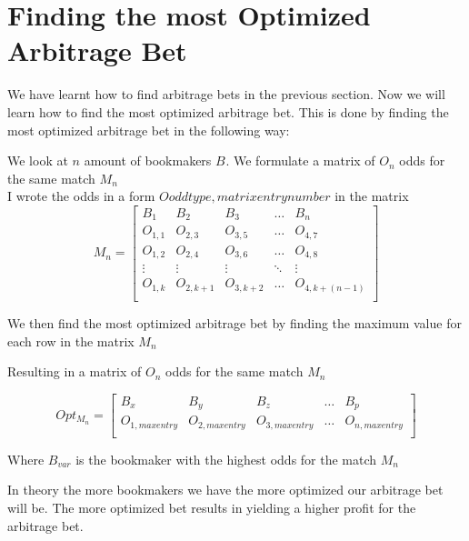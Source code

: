 
\section{Finding the most Optimized Arbitrage Bet}

We have learnt how to find arbitrage bets in the previous section. Now we will learn how to find the most optimized arbitrage bet. This is done by finding the most optimized arbitrage bet in the following way:

We look at $n$ amount of bookmakers $B_{}$. We formulate a matrix of $O_{n}$ odds for the same match $M_{n}$\\

I wrote the odds in a form $O{oddtype,matrixentrynumber}$ in the matrix\\

\begin{equation}
    M_{n} = \begin{bmatrix}
        B_{1} & B_{2} & B_{3} & \dots & B_{n} \\
        O_{1,1} & O_{2,3} & O_{3,5} & \dots & O_{4,7} \\
        O_{1,2} & O_{2,4} & O_{3,6} & \dots & O_{4,8} \\
        \vdots & \vdots & \vdots & \ddots & \vdots \\
        O_{1,k} & O_{2,k+1} & O_{3,k+2} & \dots & O_{4,k+(n-1)} \\
    \end{bmatrix}
\end{equation}

We then find the most optimized arbitrage bet by finding the maximum value for each row in the matrix $M_{n}$

Resulting in a matrix of $O_{n}$ odds for the same match $M_{n}$

\begin{equation}
    Opt_{M_{n}} = \begin{bmatrix}
        B_{x} & B_{y} & B_{z} & \dots & B_{p} \\
        O_{1,maxentry} & O_{2,maxentry} & O_{3,maxentry} & \dots & O_{n,maxentry} \\
    \end{bmatrix}
\end{equation}

Where $B_{var}$ is the bookmaker with the highest odds for the match $M_{n}$

In theory the more bookmakers we have the more optimized our arbitrage bet will be. The more optimized bet results in yielding a higher profit for the arbitrage bet.\\

